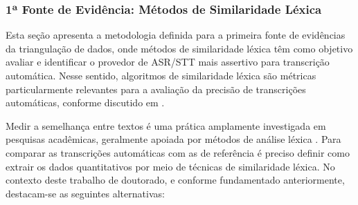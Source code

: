 \subsubsection{1ª Fonte de Evidência: Métodos de Similaridade Léxica}

Esta seção apresenta a metodologia definida para a primeira fonte de evidências da triangulação de dados, onde métodos de similaridade léxica têm como objetivo avaliar e identificar o provedor de ASR/STT mais assertivo para transcrição automática. Nesse sentido, algoritmos de similaridade léxica são métricas particularmente relevantes para a avaliação da precisão de transcrições automáticas, conforme discutido em .

Medir a semelhança entre textos é uma prática amplamente investigada em pesquisas acadêmicas, geralmente apoiada por métodos de análise léxica \cite{Majumdar2022}. Para comparar as transcrições automáticas com as de referência é preciso definir como extrair os dados quantitativos por meio de técnicas de similaridade léxica. No contexto deste trabalho de doutorado, e conforme fundamentado anteriormente, destacam-se as seguintes alternativas:

